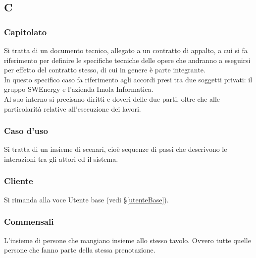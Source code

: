 \subsection{C}

\subsubsection{Capitolato}
Si tratta di un documento tecnico, allegato a un contratto di appalto, a cui si
fa riferimento per definire le specifiche tecniche delle opere che andranno a
eseguirsi per effetto del contratto stesso, di cui in genere è parte integrante.\\
In questo specifico caso fa riferimento agli accordi presi tra due soggetti
privati: il gruppo SWEnergy e l'azienda Imola Informatica. \\
Al suo interno si precisano diritti e doveri delle due parti, oltre che alle
particolarità relative all'esecuzione dei lavori.

\subsubsection{Caso d'uso}
Si tratta di un insieme di scenari, cioè sequenze di passi che descrivono le
interazioni tra gli attori ed il sistema.

\subsubsection{Cliente} 
Si rimanda alla voce Utente base (vedi \S\ref{utenteBase}).

\subsubsection{Commensali} 
L'insieme di persone che mangiano insieme allo stesso tavolo. Ovvero tutte quelle persone che fanno parte della stessa prenotazione.

\newpage


